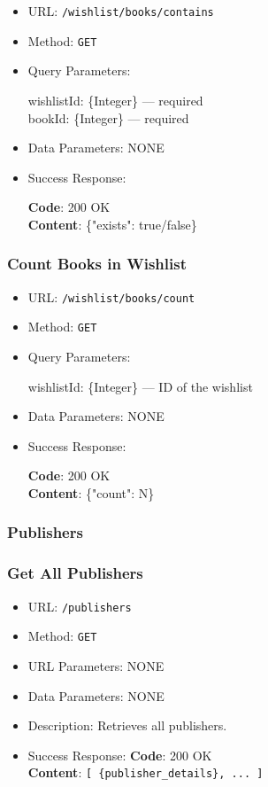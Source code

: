 \begin{itemize}
    \item URL: \texttt{/wishlist/books/contains}
    \item Method: \texttt{GET}
    \item Query Parameters:

    wishlistId: \{Integer\} — required \\
    bookId: \{Integer\} — required

    \item Data Parameters: NONE

    \item Success Response: \newline

    \textbf{Code}: 200 OK \\
    \textbf{Content}: \{"exists": true/false\}
\end{itemize}

\subsubsection*{Count Books in Wishlist}

\begin{itemize}
    \item URL: \texttt{/wishlist/books/count}
    \item Method: \texttt{GET}
    \item Query Parameters:

    wishlistId: \{Integer\} — ID of the wishlist

    \item Data Parameters: NONE

    \item Success Response: \newline

    \textbf{Code}: 200 OK \\
    \textbf{Content}: \{"count": N\}
\end{itemize}

\subsubsection*{Publishers}

\subsubsection*{Get All Publishers}

\begin{itemize}
    \item URL: \texttt{/publishers}
    \item Method: \texttt{GET}
    \item URL Parameters: NONE
    \item Data Parameters: NONE
    \item Description: Retrieves all publishers.
    
    \item Success Response: \newline
    \textbf{Code}: 200 OK \\
    \textbf{Content}: \texttt{[ \{publisher\_details\}, ... ]}
\end{itemize}

